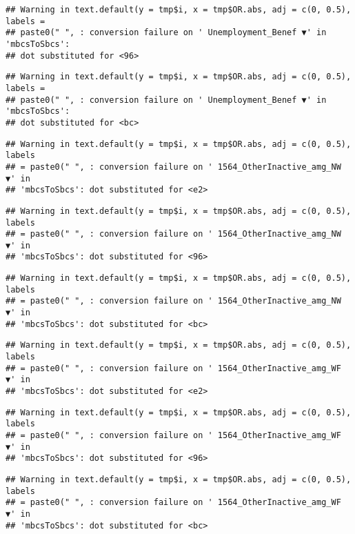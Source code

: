 \documentclass[
]{article}
\begin{document}
\begin{verbatim}
## Warning in text.default(y = tmp$i, x = tmp$OR.abs, adj = c(0, 0.5), labels =
## paste0(" ", : conversion failure on ' Unemployment_Benef ▼' in 'mbcsToSbcs':
## dot substituted for <96>
\end{verbatim}

\begin{verbatim}
## Warning in text.default(y = tmp$i, x = tmp$OR.abs, adj = c(0, 0.5), labels =
## paste0(" ", : conversion failure on ' Unemployment_Benef ▼' in 'mbcsToSbcs':
## dot substituted for <bc>
\end{verbatim}

\begin{verbatim}
## Warning in text.default(y = tmp$i, x = tmp$OR.abs, adj = c(0, 0.5), labels
## = paste0(" ", : conversion failure on ' 1564_OtherInactive_amg_NW ▼' in
## 'mbcsToSbcs': dot substituted for <e2>
\end{verbatim}

\begin{verbatim}
## Warning in text.default(y = tmp$i, x = tmp$OR.abs, adj = c(0, 0.5), labels
## = paste0(" ", : conversion failure on ' 1564_OtherInactive_amg_NW ▼' in
## 'mbcsToSbcs': dot substituted for <96>
\end{verbatim}

\begin{verbatim}
## Warning in text.default(y = tmp$i, x = tmp$OR.abs, adj = c(0, 0.5), labels
## = paste0(" ", : conversion failure on ' 1564_OtherInactive_amg_NW ▼' in
## 'mbcsToSbcs': dot substituted for <bc>
\end{verbatim}

\begin{verbatim}
## Warning in text.default(y = tmp$i, x = tmp$OR.abs, adj = c(0, 0.5), labels
## = paste0(" ", : conversion failure on ' 1564_OtherInactive_amg_WF ▼' in
## 'mbcsToSbcs': dot substituted for <e2>
\end{verbatim}

\begin{verbatim}
## Warning in text.default(y = tmp$i, x = tmp$OR.abs, adj = c(0, 0.5), labels
## = paste0(" ", : conversion failure on ' 1564_OtherInactive_amg_WF ▼' in
## 'mbcsToSbcs': dot substituted for <96>
\end{verbatim}

\begin{verbatim}
## Warning in text.default(y = tmp$i, x = tmp$OR.abs, adj = c(0, 0.5), labels
## = paste0(" ", : conversion failure on ' 1564_OtherInactive_amg_WF ▼' in
## 'mbcsToSbcs': dot substituted for <bc>
\end{verbatim}
\end{document}
